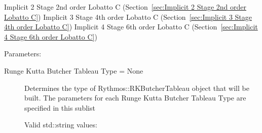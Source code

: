 \begin{list}{}
    Implicit 2 Stage 2nd order Lobatto C (Section~\ref{sec:Implicit 2 Stage 2nd order Lobatto C})
      \newline 
    Implicit 3 Stage 4th order Lobatto C (Section~\ref{sec:Implicit 3 Stage 4th order Lobatto C})
      \newline 
    Implicit 4 Stage 6th order Lobatto C (Section~\ref{sec:Implicit 4 Stage 6th order Lobatto C})
  \item[Parameters:]
    \begin{description}
      \item[Runge Kutta Butcher Tableau Type = None] 
Determines the type of Rythmos::RKButcherTableau object that will be built.
The parameters for each Runge Kutta Butcher Tableau Type are specified in this sublist

  Valid std::string values:


\end{description}
\end{list}

